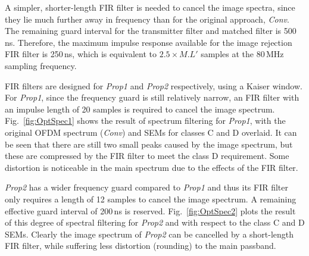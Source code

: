 A simpler, shorter-length FIR filter is needed to cancel the image spectra, since they lie much further away in frequency than for the original approach, \emph{Conv}.
The remaining guard interval for the transmitter filter and matched filter is 500\,ns.
Therefore, the maximum impulse response available for the image rejection FIR filter is 250\,ns, which is equivalent to $2.5 \times M.L'$ samples at the 80\,MHz sampling frequency.

FIR filters are designed for \emph{Prop1} and \emph{Prop2} respectively, using a Kaiser window. For \emph{Prop1}, since the frequency guard is still relatively narrow, an FIR filter with an impulse length of 20 samples is required to cancel the image spectrum.
Fig.~\ref{fig:OptSpec1} shows the result of spectrum filtering for \emph{Prop1}, with the original OFDM spectrum (\emph{Conv}) and SEMs for classes C and D overlaid.
It can be seen that there are still two small peaks caused by the image spectrum, but these are compressed by the FIR filter to meet the class D requirement.
Some distortion is noticeable in the main spectrum due to the effects of the FIR filter.

\emph{Prop2} has a wider frequency guard compared to \emph{Prop1} and thus its FIR filter only requires a length of 12 samples to cancel the image spectrum. A remaining effective guard interval of 200\,ns is reserved.
Fig.~\ref{fig:OptSpec2} plots the result of this degree of spectral filtering for \emph{Prop2} and with respect to the class C and D SEMs.
Clearly the image spectrum of \emph{Prop2} can be cancelled by a short-length FIR filter, while suffering less distortion (rounding) to the main passband.

